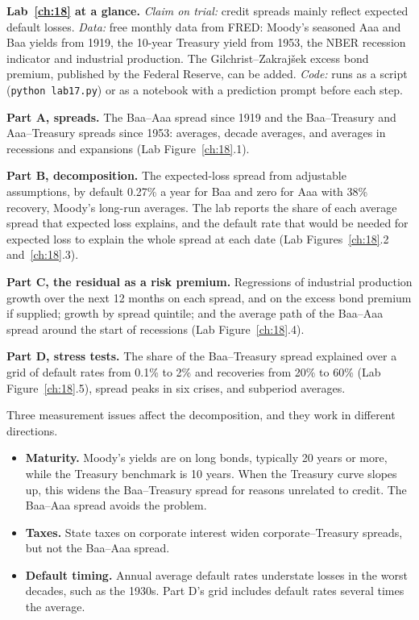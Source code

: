\begin{callout}
\textbf{Lab~\ref{ch:18} at a glance.} \emph{Claim on trial:} credit spreads mainly reflect expected default losses. \emph{Data:} free monthly data from FRED: Moody's seasoned Aaa and Baa yields from 1919, the 10-year Treasury yield from 1953, the NBER recession indicator and industrial production. The Gilchrist--Zakraj\v{s}ek excess bond premium, published by the Federal Reserve, can be added. \emph{Code:} runs as a script (\texttt{python lab17.py}) or as a notebook with a prediction prompt before each step.
\end{callout}

\textbf{Part A, spreads.} The Baa--Aaa spread since 1919 and the Baa--Treasury and Aaa--Treasury spreads since 1953: averages, decade averages, and averages in recessions and expansions (Lab Figure~\ref{ch:18}.1).

\textbf{Part B, decomposition.} The expected-loss spread from adjustable assumptions, by default 0.27\% a year for Baa and zero for Aaa with 38\% recovery, Moody's long-run averages. The lab reports the share of each average spread that expected loss explains, and the default rate that would be needed for expected loss to explain the whole spread at each date (Lab Figures~\ref{ch:18}.2 and~\ref{ch:18}.3).

\textbf{Part C, the residual as a risk premium.} Regressions of industrial production growth over the next 12 months on each spread, and on the excess bond premium if supplied; growth by spread quintile; and the average path of the Baa--Aaa spread around the start of recessions (Lab Figure~\ref{ch:18}.4).

\textbf{Part D, stress tests.} The share of the Baa--Treasury spread explained over a grid of default rates from 0.1\% to 2\% and recoveries from 20\% to 60\% (Lab Figure~\ref{ch:18}.5), spread peaks in six crises, and subperiod averages.

Three measurement issues affect the decomposition, and they work in different directions.

\begin{itemize}
  \item \textbf{Maturity.} Moody's yields are on long bonds, typically 20 years or more, while the Treasury benchmark is 10 years. When the Treasury curve slopes up, this widens the Baa--Treasury spread for reasons unrelated to credit. The Baa--Aaa spread avoids the problem.
  \item \textbf{Taxes.} State taxes on corporate interest widen corporate--Treasury spreads, but not the Baa--Aaa spread.
  \item \textbf{Default timing.} Annual average default rates understate losses in the worst decades, such as the 1930s. Part D's grid includes default rates several times the average.
\end{itemize}

